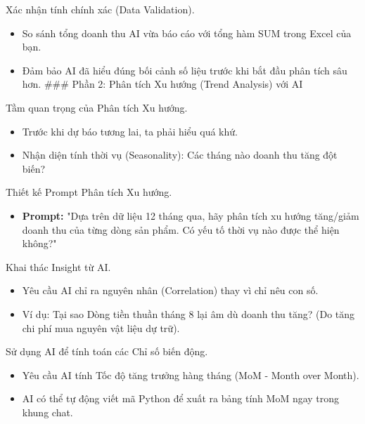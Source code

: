 \documentclass[aspectratio=169]{beamer}
\begin{document}
\begin{frame}{Xác nhận tính chính xác (Data Validation).}
    \begin{itemize}
        \item So sánh tổng doanh thu AI vừa báo cáo với tổng hàm SUM trong Excel của bạn.
        \item Đảm bảo AI đã hiểu đúng bối cảnh số liệu trước khi bắt đầu phân tích sâu hơn.
        ### Phần 2: Phân tích Xu hướng (Trend Analysis) với AI
    \end{itemize}
\end{frame}


\begin{frame}{Tầm quan trọng của Phân tích Xu hướng.}
    \begin{itemize}
        \item Trước khi dự báo tương lai, ta phải hiểu quá khứ.
        \item Nhận diện tính thời vụ (Seasonality): Các tháng nào doanh thu tăng đột biến?
    \end{itemize}
\end{frame}


\begin{frame}{Thiết kế Prompt Phân tích Xu hướng.}
    \begin{itemize}
        \item \textbf{Prompt:} "Dựa trên dữ liệu 12 tháng qua, hãy phân tích xu hướng tăng/giảm doanh thu của từng dòng sản phẩm. Có yếu tố thời vụ nào được thể hiện không?"
    \end{itemize}
\end{frame}


\begin{frame}{Khai thác Insight từ AI.}
    \begin{itemize}
        \item Yêu cầu AI chỉ ra nguyên nhân (Correlation) thay vì chỉ nêu con số.
        \item Ví dụ: Tại sao Dòng tiền thuần tháng 8 lại âm dù doanh thu tăng? (Do tăng chi phí mua nguyên vật liệu dự trữ).
    \end{itemize}
\end{frame}


\begin{frame}{Sử dụng AI để tính toán các Chỉ số biến động.}
    \begin{itemize}
        \item Yêu cầu AI tính Tốc độ tăng trưởng hàng tháng (MoM - Month over Month).
        \item AI có thể tự động viết mã Python để xuất ra bảng tính MoM ngay trong khung chat.
    \end{itemize}
\end{frame}
\end{document}
